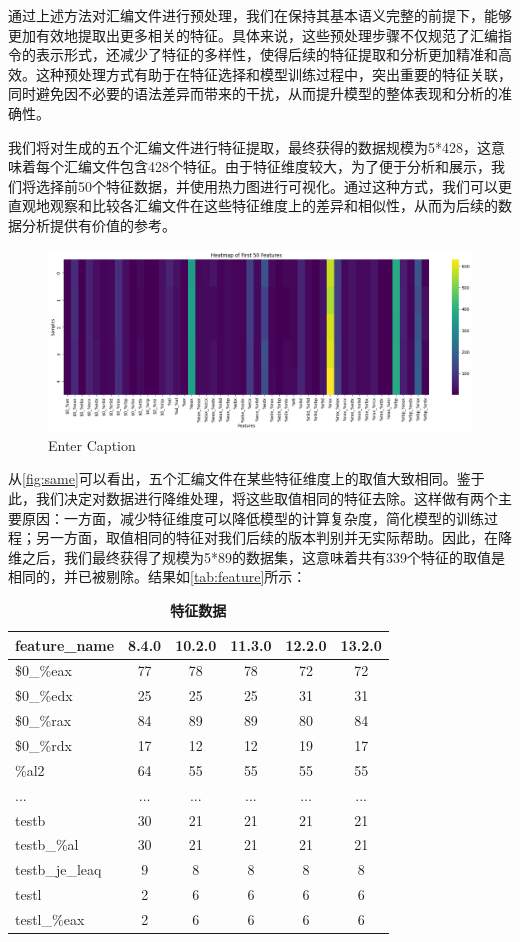   通过上述方法对汇编文件进行预处理，我们在保持其基本语义完整的前提下，能够更加有效地提取出更多相关的特征。具体来说，这些预处理步骤不仅规范了汇编指令的表示形式，还减少了特征的多样性，使得后续的特征提取和分析更加精准和高效。这种预处理方式有助于在特征选择和模型训练过程中，突出重要的特征关联，同时避免因不必要的语法差异而带来的干扰，从而提升模型的整体表现和分析的准确性。

  我们将对生成的五个汇编文件进行特征提取，最终获得的数据规模为5*428，这意味着每个汇编文件包含428个特征。由于特征维度较大，为了便于分析和展示，我们将选择前50个特征数据，并使用热力图进行可视化。通过这种方式，我们可以更直观地观察和比较各汇编文件在这些特征维度上的差异和相似性，从而为后续的数据分析提供有价值的参考。
  \begin{figure}
      \centering
      \includegraphics[width=1\linewidth]{figures/same.png}
      \caption{Enter Caption}
      \label{fig:same}
  \end{figure}


从\autoref{fig:same}可以看出，五个汇编文件在某些特征维度上的取值大致相同。鉴于此，我们决定对数据进行降维处理，将这些取值相同的特征去除。这样做有两个主要原因：一方面，减少特征维度可以降低模型的计算复杂度，简化模型的训练过程；另一方面，取值相同的特征对我们后续的版本判别并无实际帮助。因此，在降维之后，我们最终获得了规模为5*89的数据集，这意味着共有339个特征的取值是相同的，并已被剔除。结果如\autoref{tab:feature}所示：
\begin{table}[H]
\caption{\textbf{特征数据}}%
\label{tab:feature}
\centering%
\begin{tabular}{lccccc}%
\toprule%
 feature\_name&8.4.0 & 10.2.0 & 11.3.0 & 12.2.0 & 13.2.0 \\
\midrule%
\$0\_\%eax&77&78&78&72&72 \\
\$0\_\%edx&25 & 25 & 25 & 31 & 31 \\
\$0\_\%rax&84 & 89 & 89 & 80 & 84 \\
\$0\_\%rdx&17 & 12 & 12 & 19 & 17 \\
\%al2 & 64 & 55 & 55 & 55&55 \\
...&... & ... & ... & ... & ... \\
testb&30 & 21 & 21 & 21 & 21 \\
testb\_\%al&30 & 21 & 21 & 21 & 21 \\
testb\_je\_leaq&9 & 8 & 8 & 8 & 8 \\
testl&2 & 6 & 6 & 6 & 6 \\
testl\_\%eax&2 & 6 & 6 & 6 & 6 \\
\bottomrule%
\end{tabular}
\end{table}

